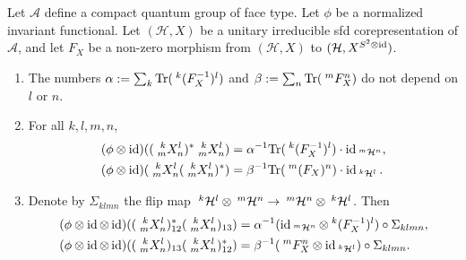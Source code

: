 \begin{Theorem} \label{thm:rep-orthogonality} Let $\mathscr{A}$ define  a
compact quantum group of face type. 
  Let $\phi$ be a normalized invariant functional. Let $(\mathcal{H},X)$ be a unitary irreducible sfd corepresentation of $\mathscr{A}$, and let $F_{X}$ be a
  non-zero morphism from $(\mathcal{H},X)$ to $(\mathcal{H},X^{S^{2}
  \otimes \id})$.
  \begin{enumerate}
  \item The numbers $\alpha:=\sum_{k} \Tr(\Gru{(F_{X}^{-1})}{k}{l})$
    and $\beta:=\sum_{n} \Tr(\Gru{F_{X}}{m}{n})$ do not depend on $l$
    or $n$.
  \item  For all $k,l,m,n$,
    \begin{align*}
      (\phi \otimes \id)((\Gr{X}{k}{l}{m}{n})^{*}\Gr{X}{k}{l}{m}{n})
      &=\alpha^{-1}{\Tr(\Gru{(F^{-1}_{X})}{k}{l})} \cdot
      \id_{\Gru{\mathcal{H}}{m}{n}}, \\
      (\phi \otimes \id)(\Gr{X}{k}{l}{m}{n}(\Gr{X}{k}{l}{m}{n})^{*})
      &=\beta^{-1}{\Tr( \Gru{(F_{X})}{m}{n})} \cdot
      \id_{\Gru{\mathcal{H}}{k}{l}}.
    \end{align*}
  \item Denote by $\Sigma_{klmn}$ the flip map $\Gru{\mathcal{H}}{k}{l}
    \otimes \Gru{\mathcal{H}}{m}{n} \to \Gru{\mathcal{H}}{m}{n}
    \otimes \Gru{\mathcal{H}}{k}{l}$. Then
 \begin{align*}
   (\phi \otimes \id \otimes
   \id)((\Gr{X}{k}{l}{m}{n})_{12}^{*}(\Gr{X}{k}{l}{m}{n})_{13}) &=
   \alpha^{-1}
   (\id_{\Gru{\mathcal{H}}{m}{n}} \otimes \Gru{(F_{X}^{-1})}{k}{l})
   \circ \Sigma_{klmn}, \\
   (\phi \otimes \id \otimes
   \id)((\Gr{X}{k}{l}{m}{n})_{13}(\Gr{X}{k}{l}{m}{n})_{12}^{*}) &= \beta^{-1} (\Gru{F_{X}}{m}{n}
   \otimes \id_{\Gru{\mathcal{H}}{k}{l}}) \circ \Sigma_{klmn}.
 \end{align*}
\end{enumerate}
  \end{Theorem}
